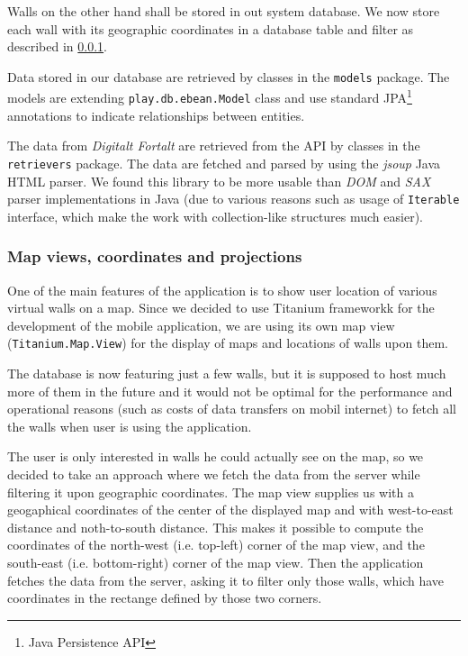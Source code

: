 \documentclass[11pt]{book}
\begin{document}
Walls on the other hand shall be stored in out system database. We now store each wall with its geographic coordinates in a database table and filter as described in \ref{sec:spr3_maps}. 

Data stored in our database are retrieved by classes in the \texttt{models} package. The models are extending \texttt{play.db.ebean.Model} class and use standard JPA\footnote{Java Persistence API} annotations to indicate relationships between entities.

The data from \emph{Digitalt Fortalt} are retrieved from the API by classes in the \texttt{retrievers} package. The data are fetched and parsed by using the \emph{jsoup} Java HTML parser. We found this library to be more usable than \emph{DOM} and \emph{SAX} parser implementations in Java (due to various reasons such as usage of \texttt{Iterable} interface, which make the work with collection-like structures much easier).

\subsubsection{Map views, coordinates and projections} \label{sec:spr3_maps}

One of the main features of the application is to show user location of various virtual walls on a map. Since we decided to use Titanium frameworkk for the development of the mobile application, we are using its own map view (\texttt{Titanium.Map.View}) for the display of maps and locations of walls upon them.

The database is now featuring just a few walls, but it is supposed to host much more of them in the future and it would not be optimal for the performance and operational reasons (such as costs of data transfers on mobil internet) to fetch all the walls when user is using the application.

The user is only interested in walls he could actually see on the map, so we decided to take an approach where we fetch the data from the server while filtering it upon geographic coordinates. The map view supplies us with a geogaphical coordinates of the center of the displayed map and with west-to-east distance and noth-to-south distance. This makes it possible to compute the coordinates of the north-west (i.e. top-left) corner of the map view, and the south-east (i.e. bottom-right) corner of the map view. Then the application fetches the data from the server, asking it to filter only those walls, which have coordinates in the rectange defined by those two corners.
\end{document}
